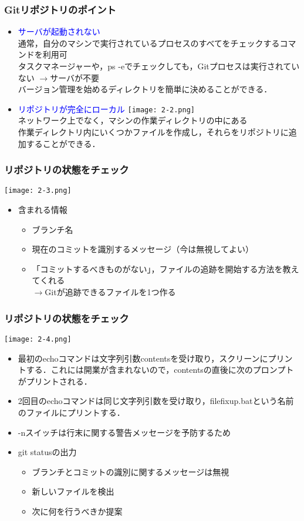 \documentclass[dvipdfmx,11pt,notheorems]{beamer}
\begin{document}
\begin{frame}
\frametitle{Gitリポジトリのポイント}
\begin{itemize}
\item \textcolor{blue}{サーバが起動されない}\\
通常，自分のマシンで実行されているプロセスのすべてをチェックするコマンドを利用可\\
タスクマネージャーや，ps -eでチェックしても，Gitプロセスは実行されていない
$\rightarrow$サーバが不要\\
バージョン管理を始めるディレクトリを簡単に決めることができる．
\item \textcolor{blue}{リポジトリが完全にローカル}
\texttt{[image: 2-2.png]}\\
ネットワーク上でなく，マシンの作業ディレクトリの中にある\\
作業ディレクトリ内にいくつかファイルを作成し，それらをリポジトリに追加することができる．
\end{itemize}
\end{frame}

\begin{frame}
\frametitle{リポジトリの状態をチェック}
\begin{center}
\texttt{[image: 2-3.png]}
\end{center}
\begin{itemize}
\item 含まれる情報
\begin{itemize}
\item ブランチ名
\item 現在のコミットを識別するメッセージ（今は無視してよい）
\item 「コミットするべきものがない」，ファイルの追跡を開始する方法を教えてくれる\\
$\rightarrow$Gitが追跡できるファイルを1つ作る
\end{itemize}
\end{itemize}
\end{frame}

\begin{frame}
\frametitle{リポジトリの状態をチェック}
\begin{center}
\texttt{[image: 2-4.png]}
\end{center}
\begin{itemize}
\item 最初のechoコマンドは文字列引数contentsを受け取り，スクリーンにプリントする．これには開業が含まれないので，contentsの直後に次のプロンプトがプリントされる．
\item 2回目のechoコマンドは同じ文字列引数を受け取り，filefixup.batという名前のファイルにプリントする．
\item -nスイッチは行末に関する警告メッセージを予防するため
\item git statusの出力
\begin{itemize}
\item ブランチとコミットの識別に関するメッセージは無視
\item 新しいファイルを検出
\item 次に何を行うべきか提案
\end{itemize}
\end{itemize}
\end{frame}
\end{document}
